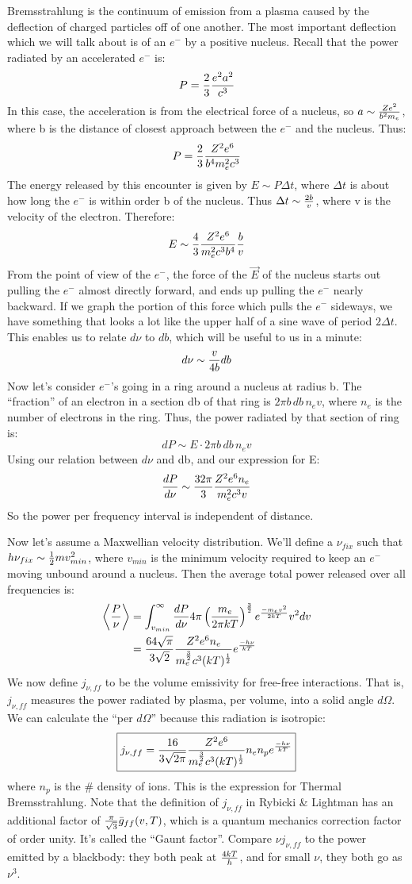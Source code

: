 \documentclass[11pt]{article}
\def\_{\bar}
\def\hf{{1 \over 2}}
\def\mean#1{\left\langle #1\right\rangle}
\def\ef{\vec E}
\begin{document}
Bremsstrahlung is the continuum of emission from a plasma caused by
the deflection of charged particles off of one another.  The most
important deflection which we will talk about is of an $e^-$ by
a positive nucleus.  Recall that the power radiated by an accelerated
$e^-$ is:
$$P={2\over3}{e^2a^2\over c^3}$$
In this case, the acceleration is from the electrical force of a
nucleus, so $a\sim{Ze^2\over b^2m_e}$, where b is the distance of
closest approach between the $e^-$ and the nucleus.  Thus:
$$P={2\over3}{Z^2e^6\over b^4m_e^2c^3}$$
The energy released by this encounter is given by $E\sim P\Delta t$, where
$\Delta t$ is about how long the $e^-$ is within order b of the nucleus.  Thus
$\Delta t\sim{2b\over v}$, where v is the velocity of the electron.  Therefore:
$$E\sim{4\over3}{Z^2e^6\over m_e^2c^3b^4}{b\over v}$$
From the point of view of the $e^-$, the force of the $\ef$ of the nucleus
starts out pulling the $e^-$ almost directly forward, and ends up pulling
the $e^-$ nearly backward.  If we graph the portion of this force which
pulls the $e^-$ sideways, we have something that looks a lot like the
upper half of a sine wave of period $2\Delta t$.  
This enables us to relate $d\nu$ to
$db$, which will be useful to us in a minute:
$$d\nu\sim{v\over4b}db$$
Now let's consider $e^-$'s going in a ring around a nucleus at radius
b.  The ``fraction'' of an electron in a section db of that ring is 
$2\pi b\,db\,n_ev$, where $n_e$ is the number of electrons in the ring.
Thus, the power radiated by that section of ring is:
$$dP\sim E\cdot2\pi b\,db\,n_ev$$
Using our relation between $d\nu$ and db, and our expression for E:
$${dP\over d\nu}\sim{32\pi\over3}{Z^2e^6n_e\over m_e^2c^3v}$$
So the power per frequency interval is independent of distance.\par
Now let's assume a Maxwellian
velocity distribution.  We'll define a $\nu_{fix}$ such that
$h\nu_{fix}\sim\hf mv_{min}^2$, where $v_{min}$ is the minimum velocity
required to keep an $e^-$ moving unbound around a nucleus.  Then
the average total power released over all frequencies is:
$$\begin{aligned}\mean{P\over\nu}&=\int_{v_{min}}^\infty{{dP\over d\nu}4\pi
\left({m_e\over2\pi kT}\right)^{3\over2}e^{-m_ev^2\over2kT}v^2dv}\\ 
&={64\sqrt{\pi}\over3\sqrt{2}}{Z^2e^6n_e\over m_e^{3\over2}c^3(kT)^\hf}
e^{-h\nu\over kT}\\ \end{aligned}$$
\def\jnff{j_{\nu,ff}}
We now define $\jnff$ to be the volume emissivity for free-free interactions.
That is, $\jnff$ measures the power radiated by plasma, per volume, into
a solid angle $d\Omega$.  We can calculate the ``per $d\Omega$'' because this
radiation is isotropic:
$$\boxed{\jnff={16\over3\sqrt{2\pi}}{Z^2e^6\over m_e^{3\over2}c^3(kT)^\hf}
n_en_pe^{-h\nu\over kT}}$$
where $n_p$ is the \# density of ions.  This is the expression for
Thermal Bremsstrahlung.  Note that the definition of $\jnff$ in Rybicki \&
Lightman has an additional factor of ${\pi\over\sqrt{3}}\_g_{ff}(v,T)$, which
is a quantum mechanics correction factor of order unity.  It's called the
``Gaunt factor''.  Compare $\nu\jnff$ to the power emitted by a blackbody:
they both peak at $4kT\over h$, and for small $\nu$, they both go as
$\nu^3$.
\end{document}
